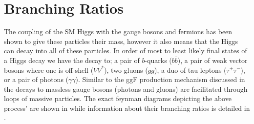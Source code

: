 \section{Branching Ratios} \label{sec:higgs:branching}

The coupling of the SM Higgs with the gauge bosons and fermions has been shown
to give these particles their mass, however it also means that the Higgs can
decay into all of these particles.  In order of most to least likely final
states of a Higgs decay we have the decay to; a pair of $b$-quarks ($b\bar{b}$),
a pair of weak vector bosons where one is off-shell ($VV^{*}$), two gluons
($gg$), a duo of tau leptons ($\tau^{+}\tau^{-}$), or a pair of photons
($\gamma\gamma$).  Similar to the ggF production mechanism discussed in
 the decays to massless gauge bosons (photons and
gluons) are facilitated through loops of massive particles. The exact feynman
diagrams depicting the above process' are shown in  while
information about their branching ratios is detailed in
.

